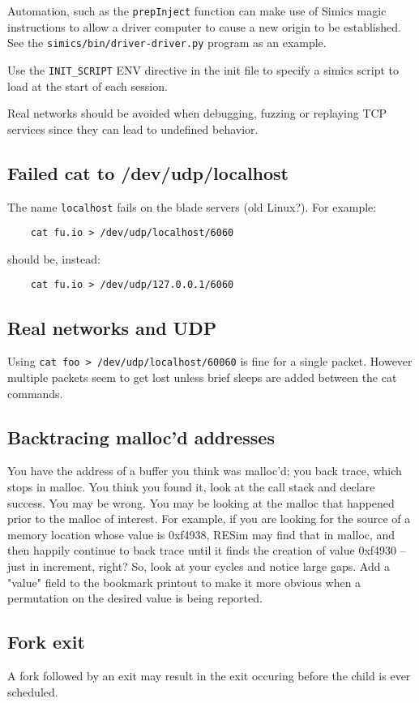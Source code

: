\documentclass[titlepage]{article}
\begin{document}
\begin{appendices}
Automation, such as the {\tt prepInject} function can make use of Simics magic instructions to allow a driver computer to cause a new origin
to be established.  See the {\tt simics/bin/driver-driver.py} program as an example.

Use the {\tt INIT\_SCRIPT} ENV directive in the init file to specify a simics script to load at the start of each session.

Real networks should be avoided when debugging, fuzzing or replaying TCP services since they can lead to undefined behavior.

\subsection{Failed cat to /dev/udp/localhost}
The name {\tt localhost} fails on the blade servers (old Linux?).   For example:
\begin{verbatim}
    cat fu.io > /dev/udp/localhost/6060
\end{verbatim}
\noindent should be, instead:
\begin{verbatim}
    cat fu.io > /dev/udp/127.0.0.1/6060
\end{verbatim}

\subsection{Real networks and UDP}
Using {\tt cat foo > /dev/udp/localhost/60060} is fine for a single packet.  However multiple packets seem to get lost unless brief sleeps are
added between the cat commands.

\subsection{Backtracing malloc'd addresses}
You have the address of a buffer you think was malloc'd; you back trace, which stops in malloc.  You think you found it, look at the call stack and
declare success.  You may be wrong.  You may be looking at the malloc that happened prior to the malloc of interest.  For example, if you are looking
for the source of a memory location whose value is 0xf4938, RESim may find that in malloc, and then happily continue to back trace until it finds
the creation of value 0xf4930  -- just in increment, right?  So, look at your cycles and notice large gaps.
Add a "value" field to the bookmark printout to make it more obvious when a permutation on the desired value is being reported.

\subsection{Fork exit}
A fork followed by an exit may result in the exit occuring before the child is ever scheduled.


\end{appendices}
\end{document}
